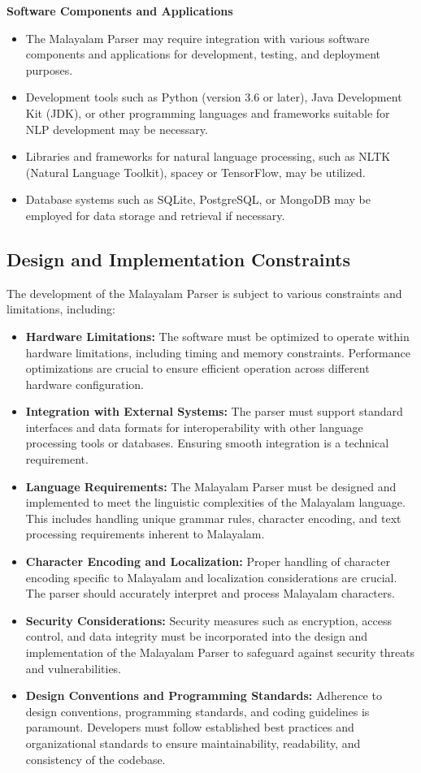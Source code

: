 \documentclass[12pt]{article}
\begin{document}
	\textbf{Software Components and Applications}
	
	\begin{itemize}[label=-]
		\item The Malayalam Parser may require integration with various software components and applications for development, testing, and deployment purposes.
		\item Development tools such as Python (version 3.6 or later), Java Development Kit (JDK), or other programming languages and frameworks suitable for NLP development may be necessary.
		\item Libraries and frameworks for natural language processing, such as NLTK (Natural Language Toolkit), spacey or TensorFlow, may be utilized.
		\item Database systems such as SQLite, PostgreSQL, or MongoDB may be employed for data storage and retrieval if necessary.
	\end{itemize}
	
	\subsection{Design and Implementation Constraints}
	The development of the Malayalam Parser is subject to various constraints and limitations, including:
	
	\begin{itemize}[label=-]
		\item \textbf{Hardware Limitations:} The software must be optimized to operate within
		hardware limitations, including timing and memory constraints. Performance
		optimizations are crucial to ensure efficient operation across different hardware
		configuration.
		\item \textbf{Integration with External Systems:}
		The parser must support standard interfaces and data formats for interoperability with other language processing tools or databases. Ensuring smooth integration is a technical requirement.
		\item \textbf{Language Requirements:} The Malayalam Parser must be designed and
		implemented to meet the linguistic complexities of the Malayalam language. This
		includes handling unique grammar rules, character encoding, and text processing
		requirements inherent to Malayalam.
		\item \textbf{Character Encoding and Localization:}
		Proper handling of character encoding specific to Malayalam and localization considerations are crucial. The parser should accurately interpret and process Malayalam characters.
		\item \textbf{Security Considerations:} Security measures such as encryption, access control,
		and data integrity must be incorporated into the design and implementation of the
		Malayalam Parser to safeguard against security threats and vulnerabilities.
		\item \textbf{Design Conventions and Programming Standards:} Adherence to design
		conventions, programming standards, and coding guidelines is paramount.
		Developers must follow established best practices and organizational standards to
		ensure maintainability, readability, and consistency of the codebase.
	\end{itemize}
	
\end{document}
